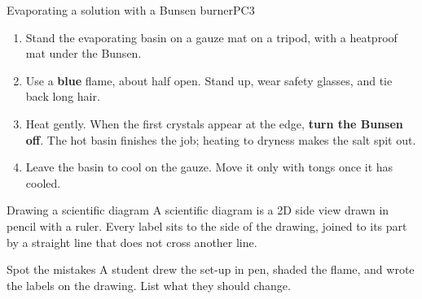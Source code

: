 
\begin{technique}{Evaporating a solution with a Bunsen burner}{PC3}
\begin{enumerate}[leftmargin=1.6em, itemsep=1pt, topsep=3pt]
  \item Stand the evaporating basin on a gauze mat on a tripod, with a heatproof mat under the Bunsen.
  \item Use a \textbf{blue} flame, about half open. Stand up, wear safety glasses, and tie back long hair.
  \item Heat gently. When the first crystals appear at the edge, \textbf{turn the Bunsen off}. The hot basin finishes the job; heating to dryness makes the salt spit out.
  \item Leave the basin to cool on the gauze. Move it only with tongs once it has cooled.
\end{enumerate}
\end{technique}

\begin{workedex}{Drawing a scientific diagram}
A scientific diagram is a 2D side view drawn in pencil with a ruler. Every label sits to the side of the drawing, joined to its part by a straight line that does not cross another line.

\smallskip
\begin{center}
\end{center}
\end{workedex}

\begin{wedo}{Spot the mistakes}
A student drew the set-up in pen, shaded the flame, and wrote the labels on the drawing. List what they should change.
\answerbox{3.5cm}
\end{wedo}

